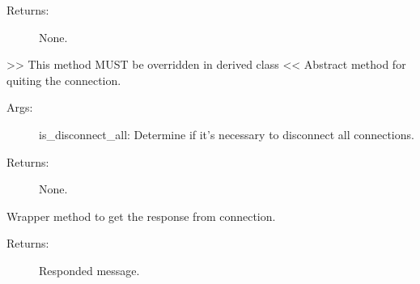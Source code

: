 \documentclass[letterpaper,10pt,english]{sphinxmanual}
\begin{document}
\begin{fulllineitems}
\begin{fulllineitems}
\begin{description}
\item[{Returns:}] \leavevmode
\sphinxAtStartPar
None.

\end{description}

\end{fulllineitems}


\begin{fulllineitems}
\label{\detokenize{QConnectBase:QConnectBase.connection_base.ConnectionBase.quit}}
\sphinxAtStartPar
\textgreater{}\textgreater{} This method MUST be overridden in derived class \textless{}\textless{}
Abstract method for quiting the connection.
\begin{description}
\item[{Args:}] \leavevmode
\sphinxAtStartPar
is\_disconnect\_all: Determine if it’s necessary to disconnect all connections.

\item[{Returns:}] \leavevmode
\sphinxAtStartPar
None.

\end{description}

\end{fulllineitems}


\begin{fulllineitems}
\label{\detokenize{QConnectBase:QConnectBase.connection_base.ConnectionBase.read_obj}}
\sphinxAtStartPar
Wrapper method to get the response from connection.
\begin{description}
\item[{Returns:}] \leavevmode
\sphinxAtStartPar
Responded message.

\end{description}

\end{fulllineitems}



\end{fulllineitems}
\end{document}
